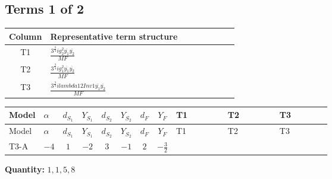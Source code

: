 \documentclass[8pt]{article}
\begin{document}
\begin{landscape}
\subsection*{Terms 1 of 2}
\begin{center}
\begin{tabular}{@{}c >{\raggedright\arraybackslash}p{0.82\linewidth}@{}}
\toprule
Column & Representative term structure \\
\midrule
T1 & \(\displaystyle \frac{3^{\frac{3}{4}} i g_{2}^{2} \overline{y_{1}} \overline{y_{2}}}{MF}\) \\
\midrule
T2 & \(\displaystyle \frac{3^{\frac{3}{4}} i g_{1}^{2} \overline{y_{1}} \overline{y_{2}}}{MF}\) \\
\midrule
T3 & \(\displaystyle \frac{3^{\frac{3}{4}} i lambda12Inv1 \overline{y_{1}} \overline{y_{2}}}{MF}\) \\
\midrule
\bottomrule
\end{tabular}
\end{center}
\smallskip
\tiny
\begin{longtable}{@{}llcccccc >{\raggedright\arraybackslash}p{0.21\linewidth} >{\raggedright\arraybackslash}p{0.21\linewidth} >{\raggedright\arraybackslash}p{0.21\linewidth}@{}}
\toprule
Model & $\alpha$ & $d_{S_1}$ & $Y_{S_1}$ & $d_{S_2}$ & $Y_{S_2}$ & $d_F$ & $Y_F$ & T1 & T2 & T3 \\
\midrule
\endfirsthead
\toprule
Model & $\alpha$ & $d_{S_1}$ & $Y_{S_1}$ & $d_{S_2}$ & $Y_{S_2}$ & $d_F$ & $Y_F$ & T1 & T2 & T3 \\
\midrule
\endhead
T3-A & $-4$ & $1$ & $-2$ & $3$ & $-1$ & $2$ & $-\frac{3}{2}$ & \scriptsize\adjustbox{max width=\linewidth}{$\begin{gathered} - \frac{11 \cdot 3^{\frac{3}{4}} i g_{2}^{2} \overline{y_{1}} \overline{y_{2}}}{8 MF}\end{gathered}$} & \scriptsize\adjustbox{max width=\linewidth}{$\begin{gathered} - \frac{9 \cdot 3^{\frac{3}{4}} i g_{1}^{2} \overline{y_{1}} \overline{y_{2}}}{8 MF}\end{gathered}$} & \scriptsize\adjustbox{max width=\linewidth}{$\begin{gathered} - \frac{3^{\frac{3}{4}} i lambda12Inv1 \overline{y_{1}} \overline{y_{2}}}{6 MF}\end{gathered}$} \\
\midrule
\bottomrule
\end{longtable}
\clearpage
\noindent\textbf{Quantity: }$\mathrm{1,1,5,8}$\par\smallskip

\end{landscape}
\end{document}
